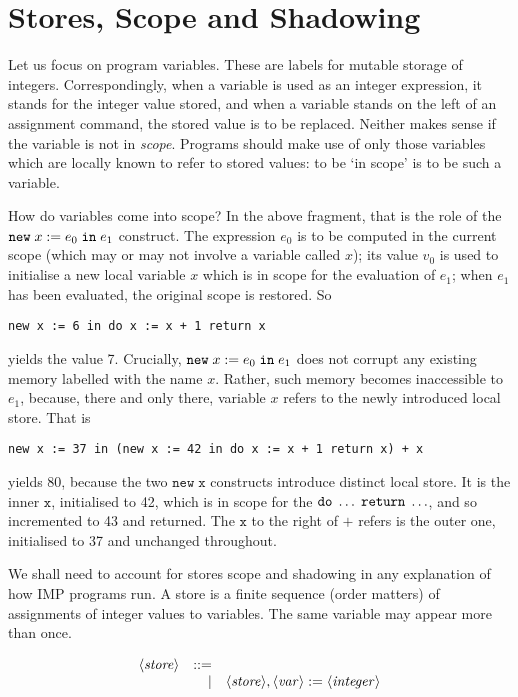 \documentclass{article}
\begin{document}
\section{Stores, Scope and Shadowing}

Let us focus on program variables. These are labels for mutable storage of integers. Correspondingly, when a variable is used as an integer expression, it stands for the integer value stored, and when a variable stands on the left of an assignment command, the stored value is to be replaced. Neither makes sense if the variable is not in \emph{scope}. Programs should make use of only those variables which are locally known to refer to stored values: to be `in scope' is to be such a variable.

How do variables come into scope? In the above fragment, that is the role of the $\mathtt{new}\;x\;\mathtt{:=}\;e_0\;\mathtt{in}\;e_1$ construct. The expression $e_0$ is to be computed in the current scope (which may or may not involve a variable called $x$); its value $v_0$ is used to initialise a new local variable $x$ which is in scope for the evaluation of $e_1$; when $e_1$ has been evaluated, the original scope is restored. So

\begin{verbatim}
new x := 6 in do x := x + 1 return x
\end{verbatim}

yields the value 7. Crucially, $\mathtt{new}\;x\;\mathtt{:=}\;e_0\;\mathtt{in}\;e_1$ does not corrupt any existing memory labelled with the name $x$. Rather, such memory becomes inaccessible to $e_1$, because, there and only there, variable $x$ refers to the newly introduced local store. That is

\begin{verbatim}
new x := 37 in (new x := 42 in do x := x + 1 return x) + x
\end{verbatim}

yields 80, because the two $\mathtt{new\;x}$ constructs introduce distinct local store. It is the inner $\mathtt{x}$, initialised to 42, which is in scope for the $\mathtt{do}\;\ldots\;\mathtt{return}\;\ldots$, and so incremented to 43 and returned. The $\mathtt{x}$ to the right of $+$ refers is the outer one, initialised to 37 and unchanged throughout.

We shall need to account for stores scope and shadowing in any explanation of how IMP programs run. A store is a finite sequence (order matters) of assignments of integer values to variables. The same variable may appear more than once.

\[\begin{array}{rrl}
    \langle \mathit{store} \rangle & ::= & \\
               &   | & \langle \mathit{store} \rangle, \langle \mathit{var} \rangle := \langle \mathit{integer} \rangle
\end{array}\]
\end{document}
